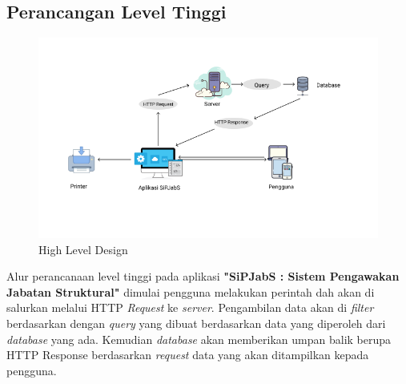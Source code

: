\begin{table}
\begin{tabular}{ | c | c | p{35mm} |}
		
		\hline
		
	\end{tabular}
\end{table}

\subsection{Perancangan Level Tinggi}

\begin{figure}
	\centering
	\includegraphics[width=1\textwidth]
	{pics/highleveldesign.png}
	\caption{High Level Design}
	\label{fig:34}
\end{figure}

Alur perancanaan level tinggi pada aplikasi \textbf{"SiPJabS : Sistem Pengawakan Jabatan Struktural"} dimulai pengguna melakukan perintah dah akan di salurkan melalui HTTP \textit{Request} ke \textit{server}. Pengambilan data akan di \textit{filter} berdasarkan dengan \textit{query} yang dibuat berdasarkan data yang diperoleh dari \textit{database} yang ada. Kemudian \textit{database} akan memberikan umpan balik berupa HTTP Response berdasarkan \textit{request} data yang akan ditampilkan kepada pengguna. 

